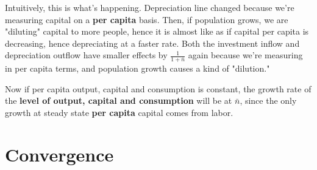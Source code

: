 \documentclass[11pt]{scrartcl}
\newcommand{\oneth}{\ensuremath{\frac{1}{3}}}
\newcommand{\twoth}{\ensuremath{\frac{2}{3}}}
\begin{document}
Intuitively, this is what's happening. Depreciation line changed because we're measuring capital on a \textbf{per capita} basis. Then, if population grows, we are "diluting" capital to more people, hence it is almost like as if capital per capita is decreasing, hence depreciating at a faster rate. Both the investment inflow and depreciation outflow have smaller effects by $\frac{1}{1+\bar{n}}$ again because we're measuring in per capita terms, and population growth causes a kind of "dilution."

Now if per capita output, capital and consumption is constant, the growth rate of the \textbf{level of output, capital and consumption} will be at $\bar{n}$, since the only growth at steady state \textbf{per capita} capital comes from labor.

%
%
%
%
%
%
%
%
%
%
%

\section{Convergence}
\end{document}
